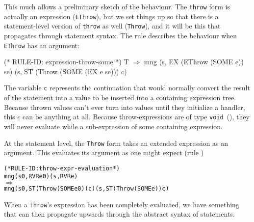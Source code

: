 \documentclass[11pt]{article}
\begin{document}
  This much
allows a preliminary sketch of the behaviour.  The \texttt{throw} form
is actually an expression (\texttt{EThrow}), but we set things up so
that there is a statement-level version of \texttt{throw} as well
(\texttt{Throw}), and it will be this that propagates through
statement syntax.  The rule  describes
the behaviour when \texttt{EThrow} has an argument:
%
\begin{stdrule}
(* RULE-ID: expression-throw-some *)
     T
   \(\Rightarrow\)
     mng (s, EX (EThrow (SOME e)) se)
         (s, ST (Throw (SOME (EX e se))) c)
\end{stdrule}
The variable \texttt{c} represents the continuation that would
normally convert the result of the statement into a value to be
inserted into a containing expression tree.  Because thrown values
can't ever turn into values until they initialize a handler, this $c$
can be anything at all.  Because throw-expressions are of type
\texttt{void}~(\cite[\S15,p1]{cpp-standard-iso14882}), they will never
evaluate while a sub-expression of some containing expression.

At the statement level, the \texttt{Throw} form takes an extended
expression as an argument.  This evaluates its argument as one might
expect (rule )
\begin{center}
\begin{minipage}{\textwidth}
\begin{alltt}
(* RULE-ID: throw-expr-evaluation *)
     mng (s0, RVR e0) (s, RVR e)
   \(\Rightarrow\)
     mng (s0, ST (Throw (SOME e0)) c) (s, ST (Throw (SOME e)) c)
\end{alltt}
\end{minipage}
\end{center}

When a \texttt{throw}'s expression has been completely evaluated, we
have something that can then propagate upwards through the abstract
syntax of statements.
\end{document}

